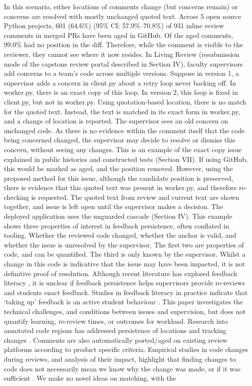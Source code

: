 \documentclass[10pt,conference,letterpaper]{IEEEtran}
\begin{document}
In this scenario, either locations of comments change (but concerns remain) or concerns are resolved with mostly unchanged quoted text. Across 5 open source Python projects, 601 (64.6\%) (95\% CI: 57.9\%--70.8\%) of 931 inline review comments in merged PRs have been aged in GitHub. Of the aged comments, 99.0\% had no position in the diff. Therefore, while the comment is visible to the reviewer, they cannot see where it now resides. In Living Review (resubmission mode of the capstone review portal described in Section IV), faculty supervisors add concerns to a team’s code across multiple versions. Suppose in version 1, a supervisor adds a concern in client.py about a retry loop never backing off. In worker.py, there is an exact copy of this loop. In version 2, this loop is fixed in client.py, but not in worker.py. Using quotation-based location, there is no match for the quoted text. Instead, the text is matched in its exact form in worker.py, and a change of location is reported. The supervisor sees an old concern on unchanged code. As there is no evidence within the comment itself that the code being concerned changed, the supervisor may decide to resolve or dismiss this concern, without seeing any changes. This is an example of the exact copy issue explained in public histories and constructed tests (Section VII). If using GitHub, this would be marked as aged, and the position removed. However, using the proposed method for this issue, although the candidate position is preserved, there is evidence that this quoted text was present in worker.py, and therefore re-checking is requested. The quoted text from review and current text are shown together, and issue is left open until the supervisor makes a decision. The deployed application uses the unguarded cascade (Section IV). This example shows three properties of interest in feedback persistence, often conflated in tooling. Whether the reviewed code changed, whether the anchor is valid, and whether the issue is unresolved by the supervisor. The first two are properties of code, and can be quantified. The third is only known by the supervisor. Whilst a change in this code is indicative that the issue may have been impacted, it is not definitive proof of resolution. Although recent literature has explored feedback literacy \cite{lei2026,istencioglu2026,little2024,carlessyoung2025}, it is unclear if feedback persistence helps supervisors provide re-reviews and students enact feedback. Studies in feedback literacy in practice indicate that ‘taking up’ feedback is an active student behaviour \cite{woitta2025,zheng2026}. This paper investigates the technical challenges, and conditions between issues and supervision, but does not quantify learning, re-review times, or outcomes for workload. Research into annotated code regions has addressed persistence of locations and tracking changes \cite{meta2024,magic2024,codetations2026,codemapper2026}. Comments are also automatically ported/aged on existing review platforms according to product specific criteria. Empirical studies in code changes during reviews, and analysis of their impact, highlight that finding changes to code does not necessarily mean we know why the change was made, or if it was sufficient \cite{fregnan2022,gocmen2025}. We make no novel ideas on matching, with the 
\end{document}
